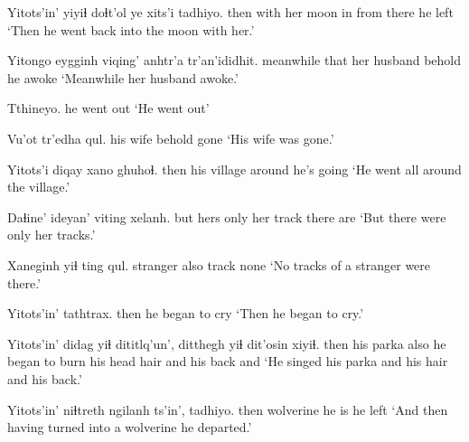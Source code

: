 \documentclass[12pt]{article}
\begin{document}
\gll Yitots'in' yiyiɬ  doɬt'ol ye xits'i  tadhiyo.
then  {with her} moon  in  {from there} {he left}
\glt `Then he went back into the moon with her.'
\glend

\gll Yitongo eygginh viqing' anhtr'a tr'an'ididhit.
meanwhile that  {her husband} behold {he awoke}
\glt `Meanwhile her husband awoke.'
\glend

\gll Tthineyo.
{{he went out}}
\glt `He went out'
\glend

\gll Vu'ot  tr'edha qul.
{his wife} behold  gone
\glt `His wife was gone.'
\glend

\gll Yitots'i diqay  xano ghuhoɬ.
then  {his village} around {he's going}
\glt `He went all around the village.'
\glend

\gll Daɬine' ideyan' viting  xelanh.
but  {hers only} {her track} {there are}
\glt `But there were only her tracks.'
\glend

\gll Xaneginh yiɬ ting qul.
stranger also track none
\glt `No tracks of a stranger were there.'
\glend

\gll Yitots'in' tathtrax.
then  {he began to cry}
\glt `Then he began to cry.'
\glend

\gll Yitots'in' didag  yiɬ dititlq'un', ditthegh yiɬ dit'osin xiyiɬ.
then  {his parka} also {he began to burn} {his head hair} and {his back} and
\glt `He singed his parka and his hair and his back.'
\glend

\gll Yitots'in' niɬtreth ngilanh ts'in', tadhiyo.
then  wolverine {he is} {} {he left}
\glt `And then having turned into a wolverine he departed.'
\glend
\end{document}
